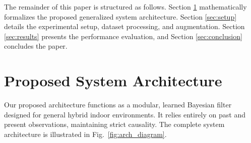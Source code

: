 \documentclass[conference]{IEEEtran}
\begin{document}
The remainder of this paper is structured as follows. Section \ref{sec:architecture} mathematically formalizes the proposed generalized system architecture. Section \ref{sec:setup} details the experimental setup, dataset processing, and augmentation. Section \ref{sec:results} presents the performance evaluation, and Section \ref{sec:conclusion} concludes the paper.

\section{Proposed System Architecture}\label{sec:architecture}

Our proposed architecture functions as a modular, learned Bayesian filter designed for general hybrid indoor environments. It relies entirely on past and present observations, maintaining strict causality. The complete system architecture is illustrated in Fig.~\ref{fig:arch_diagram}.
\end{document}
